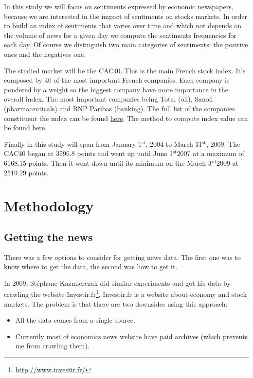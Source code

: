 \documentclass[12pt]{report}
\newcommand{\superscript}[1]{\ensuremath{^{\textrm{#1}}}}
\newcommand{\st}[0]{\superscript{st}}
\newcommand{\rd}[0]{\superscript{rd}}
\begin{document}
		In this study we will focus on sentiments expressed by economic newspapers, because we are interested in the impact of sentiments on stocks markets. In order to build an index of sentiments that varies over time and which not depends on the volume of news for a given day we compute the sentiments frequencies for each day. Of course we distinguish two main categories of sentiments: the positive ones and the negatives one.
		
		The studied market will be the CAC40. This is the main French stock index. It's composed by 40 of the most important French companies. Each company is pondered by a weight so the biggest company have more importance in the overall index. The most important companies being Total (oil), Sanofi (pharmaceuticals) and BNP Paribas (banking). The full list of the companies constituent the index can be found \href{http://en.wikipedia.org/wiki/CAC40}{here}. The method to compute index value can be found \href{http://www.euronext.com/fic/000/050/871/508718.pdf}{here}.

		Finally in this study will span from January 1\st, 2004 to March 31\st, 2009. The CAC40 began at 3596.8 points and went up until June 1\st 2007 at a maximum of 6168.15 points. Then it went down until its minimum on the March 3\rd 2009 at 2519.29 points.
		
	\chapter{Methodology}
		\section{Getting the news}
		
			There was a few options to consider for getting news data. The first one was to know where to get the data, the second was how to get it.
			
			In 2009, Stéphane Kazmierczak \cite{kazmierczak08} did similar experiments and got his data by crawling the website Investir.fr\footnote{\url{http://www.investir.fr/}}. Investir.fr is a website about economy and stock markets. The problem is that there are two downsides using this approach:
			\begin{itemize}
				\item All the data comes from a single source.
				\item Currently most of economics news website have paid archives (which prevents me from crawling them).
			\end{itemize}
			
\end{document}
